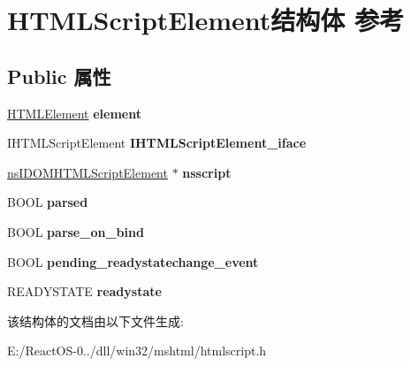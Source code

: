 \hypertarget{struct_h_t_m_l_script_element}{}\section{H\+T\+M\+L\+Script\+Element结构体 参考}
\label{struct_h_t_m_l_script_element}
\subsection*{Public 属性}
\begin{DoxyCompactItemize}
\item 
\mbox{\label{struct_h_t_m_l_script_element_a4d74100b2d7f6142d6da8eabc5299e23}} 
\hyperlink{struct_h_t_m_l_element}{H\+T\+M\+L\+Element} {\bfseries element}
\item 
\mbox{\label{struct_h_t_m_l_script_element_a38c39674ef2403dc264dc8ec6c9f5f53}} 
I\+H\+T\+M\+L\+Script\+Element {\bfseries I\+H\+T\+M\+L\+Script\+Element\+\_\+iface}
\item 
\mbox{\label{struct_h_t_m_l_script_element_ac78623013a73edbb033029f5a4432fd7}} 
\hyperlink{interfacens_i_d_o_m_h_t_m_l_script_element}{ns\+I\+D\+O\+M\+H\+T\+M\+L\+Script\+Element} $\ast$ {\bfseries nsscript}
\item 
\mbox{\label{struct_h_t_m_l_script_element_a4a4e02d425b2f342723de2ee364f39d4}} 
B\+O\+OL {\bfseries parsed}
\item 
\mbox{\label{struct_h_t_m_l_script_element_a959462c435d6582502e0b9def9edaa36}} 
B\+O\+OL {\bfseries parse\+\_\+on\+\_\+bind}
\item 
\mbox{\label{struct_h_t_m_l_script_element_a0d26b616954dd3969a15f5b39b64ec2f}} 
B\+O\+OL {\bfseries pending\+\_\+readystatechange\+\_\+event}
\item 
\mbox{\label{struct_h_t_m_l_script_element_a36753770600eacc6db1280c56bbc861a}} 
R\+E\+A\+D\+Y\+S\+T\+A\+TE {\bfseries readystate}
\end{DoxyCompactItemize}


该结构体的文档由以下文件生成\+:\begin{DoxyCompactItemize}
\item 
E\+:/\+React\+O\+S-\/0../dll/win32/mshtml/htmlscript.\+h\end{DoxyCompactItemize}
